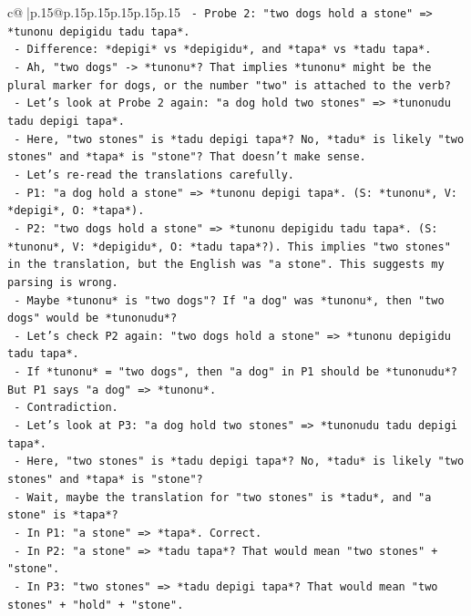 \documentclass{article}
\begin{document}
{\begin{supertabular}{c@{$\;$}|p{.15\linewidth}@{}p{.15\linewidth}p{.15\linewidth}p{.15\linewidth}p{.15\linewidth}p{.15\linewidth}}
{{{\texttt{      {-} Probe 2: "two dogs hold a stone" => *tunonu depigidu tadu tapa*.} \\
\texttt{      {-} Difference: *depigi* vs *depigidu*, and *tapa* vs *tadu tapa*.} \\
\texttt{      {-} Ah, "two dogs" {-}> *tunonu*? That implies *tunonu* might be the plural marker for dogs, or the number "two" is attached to the verb?} \\
\texttt{      {-} Let's look at Probe 2 again: "a dog hold two stones" => *tunonudu tadu depigi tapa*.} \\
\texttt{        {-} Here, "two stones" is *tadu depigi tapa*? No, *tadu* is likely "two stones" and *tapa* is "stone"? That doesn't make sense.} \\
\texttt{        {-} Let's re{-}read the translations carefully.} \\
\texttt{        {-} P1: "a dog hold a stone" => *tunonu depigi tapa*. (S: *tunonu*, V: *depigi*, O: *tapa*).} \\
\texttt{        {-} P2: "two dogs hold a stone" => *tunonu depigidu tadu tapa*. (S: *tunonu*, V: *depigidu*, O: *tadu tapa*?). This implies "two stones" in the translation, but the English was "a stone". This suggests my parsing is wrong.} \\
\texttt{        {-} Maybe *tunonu* is "two dogs"? If "a dog" was *tunonu*, then "two dogs" would be *tunonudu*?} \\
\texttt{        {-} Let's check P2 again: "two dogs hold a stone" => *tunonu depigidu tadu tapa*.} \\
\texttt{          {-} If *tunonu* = "two dogs", then "a dog" in P1 should be *tunonudu*? But P1 says "a dog" => *tunonu*.} \\
\texttt{          {-} Contradiction.} \\
\texttt{          {-} Let's look at P3: "a dog hold two stones" => *tunonudu tadu depigi tapa*.} \\
\texttt{            {-} Here, "two stones" is *tadu depigi tapa*? No, *tadu* is likely "two stones" and *tapa* is "stone"?} \\
\texttt{            {-} Wait, maybe the translation for "two stones" is *tadu*, and "a stone" is *tapa*?} \\
\texttt{            {-} In P1: "a stone" => *tapa*. Correct.} \\
\texttt{            {-} In P2: "a stone" => *tadu tapa*? That would mean "two stones" + "stone".} \\
\texttt{            {-} In P3: "two stones" => *tadu depigi tapa*? That would mean "two stones" + "hold" + "stone".} \\
}}}
\end{supertabular}}
\end{document}
